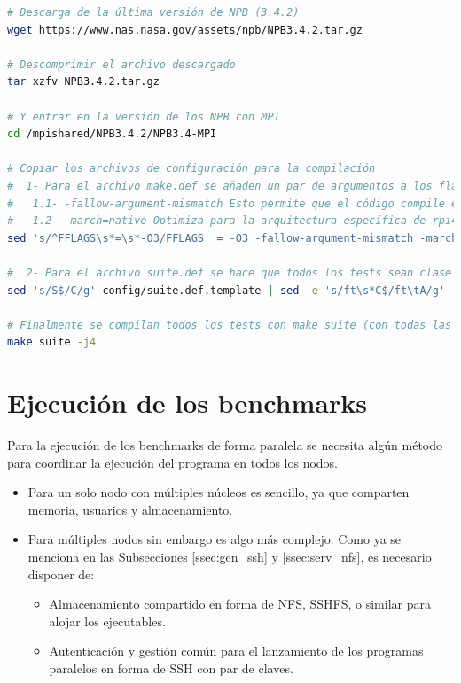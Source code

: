 \begin{lstlisting}[language=bash]
# Descarga de la última versión de NPB (3.4.2)
wget https://www.nas.nasa.gov/assets/npb/NPB3.4.2.tar.gz

# Descomprimir el archivo descargado
tar xzfv NPB3.4.2.tar.gz

# Y entrar en la versión de los NPB con MPI
cd /mpishared/NPB3.4.2/NPB3.4-MPI

# Copiar los archivos de configuración para la compilación
#  1- Para el archivo make.def se añaden un par de argumentos a los flags de compilación:
#   1.1- -fallow-argument-mismatch Esto permite que el código compile en las últimas versiones de gfortran
#   1.2- -march=native Optimiza para la arquitectura específica de rpi4
sed 's/^FFLAGS\s*=\s*-O3/FFLAGS  = -O3 -fallow-argument-mismatch -march=native/g' config/make.def.template | sed -e 's/^CFLAGS\s*=\s*-O3/CFLAGS  = -O3 -march=native/g' > config/make.def

#  2- Para el archivo suite.def se hace que todos los tests sean clase C menos FT, que por razones de memoria es clase A, y MG clase B, por los mismos motivos.
sed 's/S$/C/g' config/suite.def.template | sed -e 's/ft\s*C$/ft\tA/g' | sed -e 's/mg\s*C$/mg\tB/g' > config/suite.def

# Finalmente se compilan todos los tests con make suite (con todas las CPU en paralelo)
make suite -j4
\end{lstlisting}

\section{Ejecución de los benchmarks}
Para la ejecución de los benchmarks de forma paralela se necesita algún método para coordinar la ejecución del programa en todos los nodos.

\begin{itemize}
    \item Para un solo nodo con múltiples núcleos es sencillo, ya que comparten memoria, usuarios y almacenamiento.
    \item Para múltiples nodos sin embargo es algo más complejo. Como ya se menciona en las Subsecciones \ref{ssec:gen_ssh} y \ref{ssec:serv_nfs}, es necesario disponer de:
    \begin{itemize}
        \item Almacenamiento compartido en forma de NFS, SSHFS, o similar para alojar los ejecutables.
        \item Autenticación y gestión común para el lanzamiento de los programas paralelos en forma de SSH con par de claves.
    \end{itemize}
\end{itemize}

